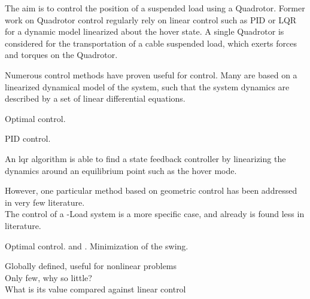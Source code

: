     				The aim is to control the position of a suspended load using a Quadrotor. Former work on Quadrotor control regularly rely on linear control such as PID or LQR for a dynamic model linearized about the hover state. A single Quadrotor is considered for the transportation of a cable suspended load, which exerts forces and torques on the Quadrotor. 
%    				    				

Numerous control methods have proven useful for  control. Many are based on a linearized dynamical model of the system, such that the system dynamics are described by a set of linear differential equations.

Optimal control. 

PID control.

An \acf{lqr} algorithm is able to find a state feedback controller by linearizing the dynamics around an equilibrium point such as the hover mode.

However, one particular method based on geometric control has been addressed in very few literature.\\

The control of a -Load system is a more specific case, and already is found less in literature. 

Optimal control.  and . Minimization of the swing.


Globally defined, useful for nonlinear problems\\
Only few, why so little?\\
What is its value compared against linear control

